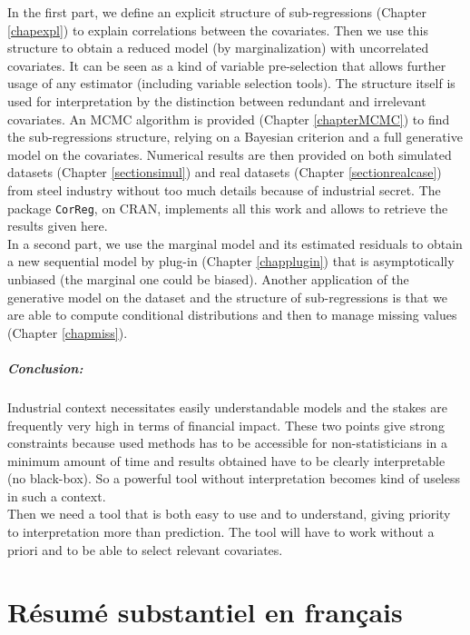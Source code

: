 \documentclass[12pt,a4paper]{report}
\begin{document}
		In the first part, we define an explicit structure of sub-regressions (Chapter \ref{chapexpl}) to explain correlations between the covariates. Then we use this structure to obtain a reduced model (by marginalization) with uncorrelated covariates. It can be seen as a kind of variable pre-selection that allows further usage of any estimator (including variable selection tools). The structure itself is used for interpretation by the distinction between redundant and irrelevant covariates. An MCMC algorithm is provided (Chapter \ref{chapterMCMC}) to find the sub-regressions structure, relying on a Bayesian criterion and a full generative model on the covariates. Numerical results are then provided on both simulated datasets (Chapter \ref{sectionsimul}) and real datasets (Chapter \ref{sectionrealcase}) from steel industry without too much details because of industrial secret. The package {\tt CorReg}, on CRAN, implements all this work and allows to retrieve the results given here. \\
		
		In a second part, we use the marginal model and its estimated residuals to obtain a new sequential model by plug-in (Chapter \ref{chapplugin}) that is asymptotically unbiased (the marginal one could be biased). Another application of the generative model on the dataset and the structure of sub-regressions is that we are able to compute conditional distributions and then to manage missing values (Chapter \ref{chapmiss}).  

\paragraph{Conclusion:} Industrial context necessitates easily understandable models and the stakes are frequently very high in terms of financial impact. 
		These two points give strong constraints because used methods has to be accessible for non-statisticians in a minimum amount of time and results obtained have to be clearly interpretable (no black-box). So a powerful tool without interpretation becomes kind of useless in such a context.\\
 Then we need a tool that is both easy to use and to understand, giving priority to interpretation more than prediction. The tool will have to work without a priori and to be able to select relevant covariates. \\		
		
\chapter{Résumé substantiel en français}\label{frenchsum}
\end{document}
